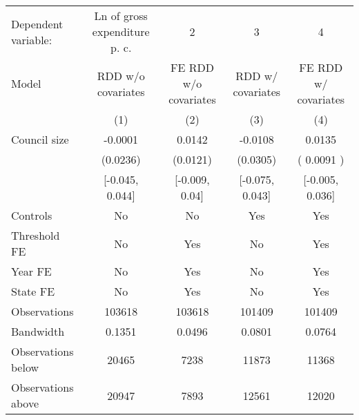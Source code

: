 \begin{tabular}{lcccc}
  \toprule
 \midrule
Dependent variable: & Ln of gross expenditure p. c. & 2 & 3 & 4 \\ 
 Model & RDD w/o covariates & FE RDD w/o covariates & RDD w/ covariates & FE RDD w/ covariates \\ 
   & (1) & (2) & (3) & (4) \\ 
   \midrule
Council size & -0.0001 & 0.0142 & -0.0108 & 0.0135 \\ 
   & (0.0236) & (0.0121) & (0.0305) & ( 0.0091 ) \\ 
   & [-0.045, 0.044] & [-0.009, 0.04] & [-0.075, 0.043] & [-0.005, 0.036] \\ 
   \midrule
Controls & No & No & Yes & Yes \\ 
  Threshold FE & No & Yes & No & Yes \\ 
  Year FE & No & Yes & No & Yes \\ 
  State FE & No & Yes & No & Yes \\ 
   \midrule
Observations & 103618 & 103618 & 101409 & 101409 \\ 
  Bandwidth & 0.1351 & 0.0496 & 0.0801 & 0.0764 \\ 
  Observations below & 20465 & 7238 & 11873 & 11368 \\ 
  Observations above & 20947 & 7893 & 12561 & 12020 \\ 
   \midrule
 \bottomrule
\end{tabular}
